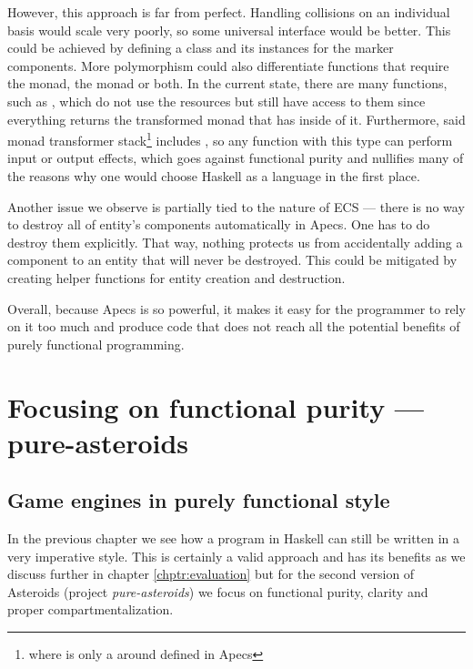 \documentclass[
  digital, %
  color,   %
  table,   %
  oneside, %
  lof,     %
  lot,     %
]{fithesis3}
\begin{document}
However, this approach is far from perfect. Handling collisions on an
individual basis would scale very poorly, so some universal interface would be better.
This could be achieved by defining a class and its instances for the marker components.
More polymorphism could also differentiate functions that require the
 monad, the  monad or both.
In the current state, there are many functions, such as ,
which do not use the resources but still have access to them since
everything returns the transformed  monad
that has  inside of it. Furthermore,
said monad transformer stack\footnote{
where  is only a 
around  defined in Apecs
}
includes , so any function with this type can perform
input or output effects, which goes against functional purity and nullifies
many of the reasons why one would choose Haskell as a language in the first place.

Another issue we observe is partially tied to the nature of ECS — there
is no way to destroy all of entity's components automatically in Apecs.
One has to do destroy them explicitly. That way, nothing protects us
from accidentally adding a component to an entity that will never be destroyed.
This could be mitigated by creating helper functions for entity creation and destruction.

Overall, because Apecs is so powerful, it makes it easy for the programmer to rely
on it too much and produce code that does not reach all the potential
benefits of purely functional programming.




\chapter{Focusing on functional purity --- pure-asteroids}
\label{chptr:purity}

\section{Game engines in purely functional style}
\label{sect:pureengines}

In the previous chapter we see how a program in Haskell can still be
written in a very imperative style. 
This is certainly a valid approach and has its benefits as we discuss
further in chapter \ref{chptr:evaluation} but for the second version of
Asteroids (project \emph{pure-asteroids}) we focus on functional purity,
clarity and proper compartmentalization.
\end{document}
